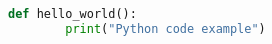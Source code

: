 \begin{lstlisting}[language=Python,caption={Example Code 1}]
    def hello_world():
        print("Python code example")
\end{lstlisting}